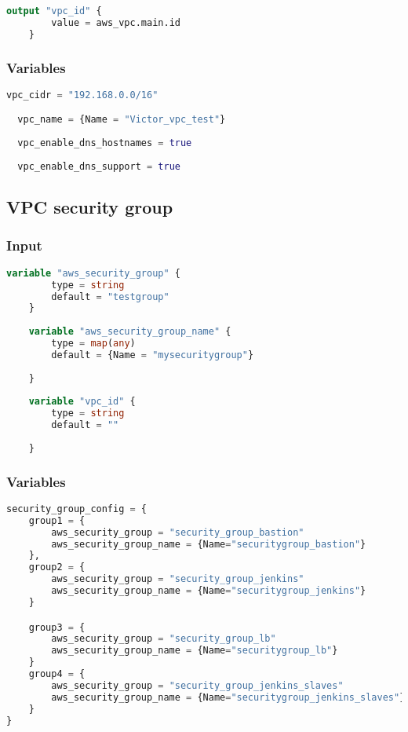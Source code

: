 \begin{lstlisting}[language=terraform]
    output "vpc_id" {
        value = aws_vpc.main.id
    }   
\end{lstlisting}

\subsubsection{
{Variables}}
\label{sec:Variables}

\begin{lstlisting}[language=terraform]
  vpc_cidr = "192.168.0.0/16"

  vpc_name = {Name = "Victor_vpc_test"}
  
  vpc_enable_dns_hostnames = true
  
  vpc_enable_dns_support = true
\end{lstlisting}

\subsection{
{VPC security group}}
\label{sec:VPC security group}

\subsubsection{
{Input}}
\label{sec:Input}

\begin{lstlisting}[language=terraform]
    variable "aws_security_group" {
        type = string
        default = "testgroup"
    }
    
    variable "aws_security_group_name" {
        type = map(any)
        default = {Name = "mysecuritygroup"}
      
    }
    
    variable "vpc_id" {
        type = string
        default = ""
      
    }
\end{lstlisting}

\subsubsection{
{Variables}}
\label{sec:Variables}

\begin{lstlisting}[language=terraform]
  security_group_config = {
    group1 = {
        aws_security_group = "security_group_bastion"
        aws_security_group_name = {Name="securitygroup_bastion"}
    },  
    group2 = {
        aws_security_group = "security_group_jenkins"
        aws_security_group_name = {Name="securitygroup_jenkins"}
    }

    group3 = {
        aws_security_group = "security_group_lb"
        aws_security_group_name = {Name="securitygroup_lb"}
    }
    group4 = {
        aws_security_group = "security_group_jenkins_slaves"
        aws_security_group_name = {Name="securitygroup_jenkins_slaves"}
    }
}
\end{lstlisting}

